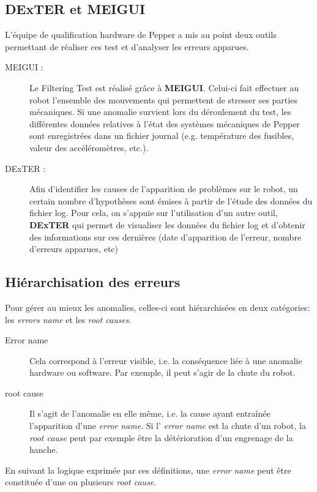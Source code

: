  \subsection{DExTER et MEIGUI}
 \label{Introduction:Expression du besoin:DExTER et MEIGUI}
 L'équipe de qualification hardware de Pepper a mis au point deux outils permettant de réaliser ces test et d'analyser les erreurs apparues.
 \begin{description}
 	\item[MEIGUI :] Le Filtering Test est réalisé grâce à \textbf{MEIGUI}. Celui-ci fait effectuer au robot l'ensemble des mouvements qui permettent de stresser ses parties mécaniques. Si une anomalie survient lors du déroulement du test, les différentes données relatives à l'état des systèmes mécaniques de Pepper sont enregistrées dans un fichier journal (e.g. température des fusibles, valeur des accéléromètres, etc.). 
 	\item[DExTER :] Afin d'identifier les causes de l'apparition de problèmes sur le robot, un certain nombre d'hypothèses sont émises à partir de l'étude des données du fichier log. Pour cela, on s'appuie sur l'utilisation d'un autre outil, \textbf{DExTER} qui permet de visualiser les données du fichier log et d'obtenir des informations sur ces dernières (date d'apparition de l'erreur, nombre d'erreurs apparues, etc)
 \end{description}
 
\subsection{Hiérarchisation des erreurs}
\label{Introduction:Expression du besoin:Hiérarchisation des erreurs}
Pour gérer au mieux les anomalies, celles-ci sont hiérarchisées en deux catégories: les \emph{errors name} et les \emph{root causes}.
\begin{description}
	\item [Error name] Cela correspond à l'erreur visible, i.e. la conséquence liée à une anomalie hardware ou software. Par exemple, il peut s'agir de la chute du robot. 
	\item [root cause] Il s'agit de l'anomalie en elle même, i.e. la cause ayant entraînée l'apparition d'une \emph{error name}. Si l' \emph{error name} est la chute d'un robot, la \emph{root cause} peut par exemple être la détérioration d'un engrenage de la hanche.   
\end{description} 

En suivant la logique exprimée par ces définitions, une \emph{error name} peut être constituée d'une ou plusieurs \emph{root cause}. 


